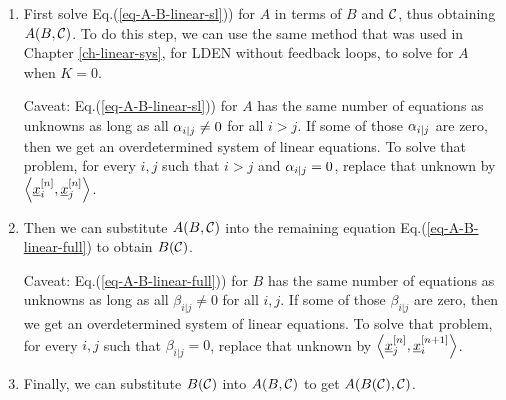 \begin{enumerate}
\item First solve
Eq.(\ref{eq-A-B-linear-sl})) for $A$ in terms of $B$ and ${\cal C}$, thus obtaining $A(B,
{\cal C})$.
To do this step,
we can use the same method that was used
in Chapter \ref{ch-linear-sys},
for LDEN without feedback loops, to solve for
$A$ when $K= 0$.
 
Caveat: Eq.(\ref{eq-A-B-linear-sl})) for $A$ has the same number of equations as unknowns as long as
all $\alpha_{i|j}\neq 0$ for all $i>j$. If some of those $\alpha_{i|j}$ are zero, then we get an
overdetermined system of linear equations.
To solve that problem, for every 
$i, j$ such that $i>j$ and  $\alpha_{i|j}= 0$,
replace that unknown by $\left\langle{\underline{x}}_i^{[n]},
{\underline{x}}_j^{[n]}\right\rangle$.

\item Then we can substitute $A(B, {\cal C})$ into the remaining equation
Eq.(\ref{eq-A-B-linear-full})
to obtain $B({\cal C})$. 

Caveat: Eq.(\ref{eq-A-B-linear-full})) for $B$ has the same number of equations as unknowns as long as
all $\beta_{i|j}\neq 0$ for all $i,j$. If some of those $\beta_{i|j}$ are zero, then we get an
overdetermined system of linear equations.
To solve that problem, for every 
$i, j$ such that $\beta_{i|j}= 0$,
replace that unknown by $\left\langle{\underline{x}}_j^{[n]},
{\underline{x}}_i^{[n+1]}\right\rangle$.

\item Finally, we can substitute $B({\cal C})$ into $A(B,
{\cal C})$ to get $A(B({\cal C}), {\cal C})$.
\end{enumerate}
 
 


